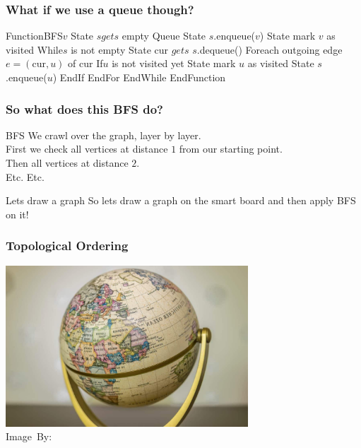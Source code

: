 \begin{frame}
	\frametitle{What if we use a queue though?}
	
	\pause
	\begin{block}
		Function{BFS}{$v$}
		State $s gets$ empty \alert{Queue}
		State $s$.enqueue($v$)
		State mark $v$ as visited
		While{$s$ is not empty}
		State cur $gets$ $s$.dequeue()
		For{each outgoing edge $e=(\text{cur},u)$ of $\text{cur}$}
		If{$u$ is not visited yet}
		State mark $u$ as visited
		State $s$.enqueue($u$)
		EndIf
		EndFor
		EndWhile
		EndFunction
	\end{block}
\end{frame}
	
\begin{frame}
	\frametitle{So what does this BFS do?}

		\begin{block}{BFS}
			We crawl over the graph, layer by layer.\\
			\pause
			First we check all vertices at distance $1$ from our starting point.\\
			\pause
			Then all vertices at distance $2$.\\
			Etc. Etc.
		\end{block}	
	\begin{block}{Lets draw a graph}
		So lets draw a graph on the smart board and then apply BFS on it!
	\end{block}
\pause
	
\end{frame}


\begin{frame}
	\frametitle{Topological Ordering}
	
	\begin{center}
		\includegraphics[width=0.68\textwidth]{images/topology.jpeg}\\
		\hspace*{15pt}\hbox{\scriptsize Image By:}
	\end{center}
\end{frame}

